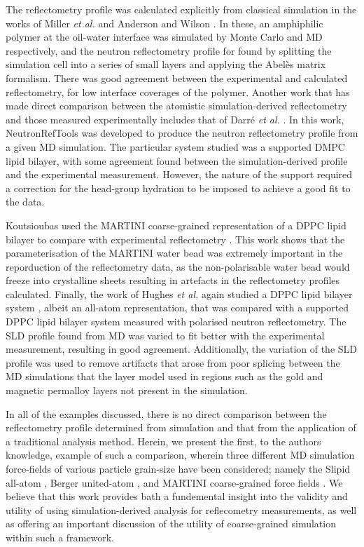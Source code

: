 \documentclass[amsmath,amssymb,twocolumn,superscriptaddress,aps,prl]{revtex4-1}
\begin{document}
The reflectometry profile was calculated explicitly from classical simulation in the works of Miller \emph{et al.} and Anderson and Wilson \cite{Miller2003,Anderson2004}.
In these, an amphiphilic polymer at the oil-water interface was simulated by Monte Carlo and MD respectively, and the neutron reflectometry profile for found by splitting the simulation cell into a series of small layers and applying the Abel\`{e}s matrix formalism.
There was good agreement between the experimental and calculated reflectometry, for low interface coverages of the polymer.
Another work that has made direct comparison between the atomistic simulation-derived reflectometry and those measured experimentally includes that of Darr\'{e} \emph{et al.} \cite{Darre2015}.
In this work, NeutronRefTools was developed to produce the neutron reflectometry profile from a given MD simulation.
The particular system studied was a supported DMPC lipid bilayer, with some agreement found between the simulation-derived profile and the experimental measurement.
However, the nature of the support required a correction for the head-group hydration to be imposed to achieve a good fit to the data.

Koutsioubas used the MARTINI coarse-grained representation of a DPPC lipid bilayer to compare with experimental reflectometry \cite{Koutsioubas2016}.
This work shows that the parameterisation of the MARTINI water bead was extremely important in the reporduction of the reflectometry data, as the non-polarisable water bead would freeze into crystalline sheets resulting in artefacts in the reflectometry profiles calculated.
Finally, the work of Hughes \emph{et al.} again studied a DPPC lipid bilayer system \cite{Hughes2016}, albeit an all-atom representation, that was compared with a supported DPPC lipid bilayer system measured with polarised neutron reflectometry.
The SLD profile found from MD was varied to fit better with the experimental measurement, resulting in good agreement.
Additionally, the variation of the SLD profile was used to remove artifacts that arose from poor splicing between the MD simulations that the layer model used in regions such as the gold and magnetic permalloy layers not present in the simulation.

In all of the examples discussed, there is no direct comparison between the reflectometry profile determined from simulation and that from the application of a traditional analysis method.
Herein, we present the first, to the authors knowledge, example of such a comparison, wherein three different MD simulation force-fields of various particle grain-size have been considered; namely the Slipid all-atom \cite{Jambeck2012}, Berger united-atom \cite{Berger1997}, and MARTINI coarse-grained force fields \cite{Marrink2007}.
We believe that this work provides bath a fundemental insight into the validity and utility of using simulation-derived analysis for reflecometry measurements, as well as offering an important discussion of the utility of coarse-grained simulation within such a framework.
\end{document}
